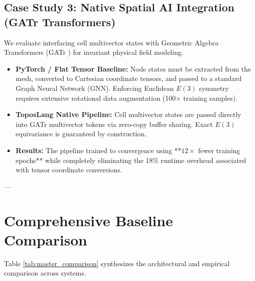 \subsection{Case Study 3: Native Spatial AI Integration (GATr Transformers)}
We evaluate interfacing \ToposLang{} cell multivector states with Geometric Algebra Transformers (GATr \cite{brehmer2023geometric}) for invariant physical field modeling.
\begin{itemize}[leftmargin=1.5cm]
    \item \textbf{PyTorch / Flat Tensor Baseline:} Node states must be extracted from the mesh, converted to Cartesian coordinate tensors, and passed to a standard Graph Neural Network (GNN). Enforcing Euclidean $E(3)$ symmetry requires extensive rotational data augmentation (100$\times$ training samples).
    \item \textbf{ToposLang Native Pipeline:} Cell multivector states are passed directly into GATr multivector tokens via zero-copy buffer sharing. Exact $E(3)$ equivariance is guaranteed by construction.
    \item \textbf{Results:} The \ToposLang{} pipeline trained to convergence using **$12\times$ fewer training epochs** while completely eliminating the 18\% runtime overhead associated with tensor coordinate conversions.
\end{itemize}

---

\section{Comprehensive Baseline Comparison}
\label{sec:comp_table}

Table \ref{tab:master_comparison} synthesizes the architectural and empirical comparison across systems.

